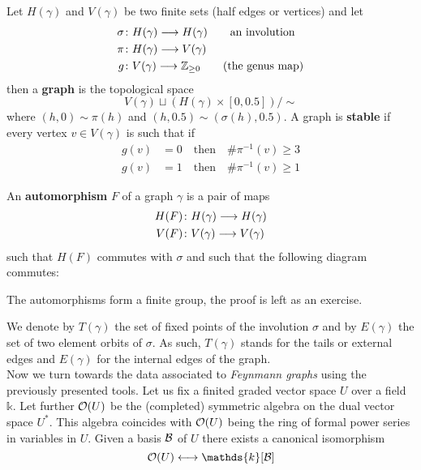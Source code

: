 \begin{definition}
  Let $H(\gamma)$ and $V(\gamma)$ be two finite sets (half edges or vertices) and let
  \begin{align*}
    \sigma &\colon H(\gamma) \longrightarrow H(\gamma) \quad \quad \text{an involution}\\
    \pi &\colon H(\gamma) \longrightarrow V(\gamma)\\
    g &\colon V(\gamma) \longrightarrow \mathbb{Z}_{\geq 0} \quad \quad \text{(the genus map)}
  \end{align*}
  then a \textbf{graph} is the topological space
  $$ V(\gamma) \sqcup (H(\gamma) \times [0, 0.5]) / \sim $$
  where $(h,0) \sim \pi(h)$ and $(h,0.5) \sim (\sigma(h), 0.5)$. A graph is \textbf{stable} if every vertex $v \in V(\gamma)$ is such that if
  \begin{align*}
    g(v) &= 0 \quad \text{then} \quad \# \pi^{-1}(v) \geq 3\\
    g(v) &= 1 \quad \text{then} \quad \# \pi^{-1}(v) \geq 1
  \end{align*}
\end{definition}

\begin{definition}
  An \textbf{automorphism} $F$ of a graph $\gamma$ is a pair of maps
  \begin{align*}
    H(F) &\colon H(\gamma) \longrightarrow H(\gamma)\\
    V(F) &\colon V(\gamma) \longrightarrow V(\gamma)
  \end{align*}
  such that $H(F)$ commutes with $\sigma$ and such that the following diagram commutes:
  \begin{center}
  \end{center}
  The automorphisms form a finite group, the proof is left as an exercise.
\end{definition}

We denote by $T(\gamma)$ the set of fixed points of the involution $\sigma$ and by $E(\gamma)$ the set of two element orbits of $\sigma$. As such, $T(\gamma)$ stands for the tails or external edges and $E(\gamma)$ for the internal edges of the graph.\\

Now we turn towards the data associated to \emph{Feynmann graphs} using the previously presented tools. Let us fix a finited graded vector space $U$ over a field $\mathds{k}$. Let further $\mathcal{O}(U)$ be the (completed) symmetric algebra on the dual vector space $U^*$. This algebra coincides with $\mathcal{O}(U)$ being the ring of formal power series in variables in $U$. Given a basis $\mathcal{B}$ of $U$ there exists a canonical isomorphism
$$ \OO(U) \longleftrightarrow \mathds{k}[\BB] $$

